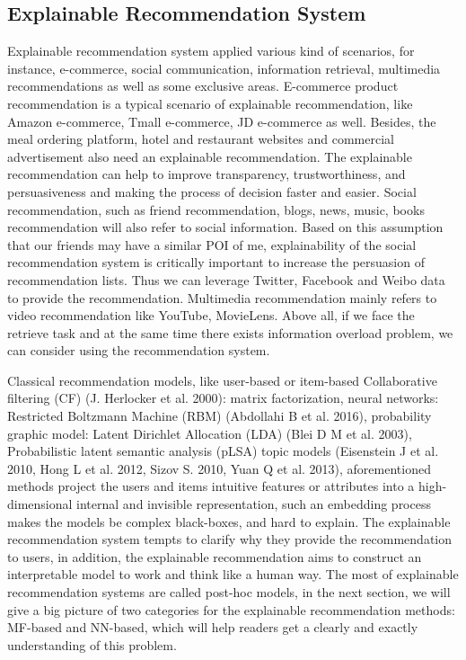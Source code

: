 \documentclass[10pt,twocolumn,letterpaper]{article}
\begin{document}
\subsection{Explainable Recommendation System}
Explainable recommendation system applied various kind of scenarios, for instance, e-commerce, social communication, information retrieval, multimedia recommendations as well as some exclusive areas. E-commerce product recommendation is a typical scenario of explainable recommendation, like Amazon e-commerce, Tmall e-commerce, JD e-commerce as well. Besides, the meal ordering platform, hotel and restaurant websites and commercial advertisement also need an explainable recommendation. The explainable recommendation can help to improve transparency, trustworthiness, and persuasiveness and making the process of decision faster and easier. Social recommendation, such as friend recommendation, blogs, news, music, books recommendation will also refer to social information. Based on this assumption that our friends may have a similar POI of me, explainability of the social recommendation system is critically important to increase the persuasion of recommendation lists. Thus we can leverage Twitter, Facebook and Weibo data to provide the recommendation. Multimedia recommendation mainly refers to video recommendation like YouTube, MovieLens. Above all, if we face the retrieve task and at the same time there exists information overload problem, we can consider using the recommendation system.

Classical recommendation models, like user-based or item-based Collaborative filtering (CF) (J. Herlocker et al. 2000): matrix factorization, neural networks: Restricted Boltzmann Machine (RBM) (Abdollahi B et al. 2016), probability graphic model: Latent Dirichlet Allocation (LDA) (Blei D M et al. 2003), Probabilistic latent semantic analysis (pLSA) topic models (Eisenstein J et al. 2010, Hong L et al. 2012, Sizov S. 2010, Yuan Q et al. 2013), aforementioned methods project the users and items intuitive features or attributes into a high-dimensional internal and invisible representation, such an embedding process makes the models be complex black-boxes, and hard to explain. The explainable recommendation system tempts to clarify why they provide the recommendation to users, in addition, the explainable recommendation aims to construct an interpretable model to work and think like a human way. The most of explainable recommendation systems are called post-hoc models, in the next section, we will give a big picture of two categories for the explainable recommendation methods: MF-based and NN-based, which will help readers get a clearly and exactly understanding of this problem.
\end{document}

